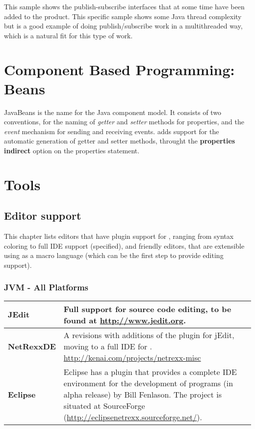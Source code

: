 {
This sample shows the publish-subscribe interfaces that at some time have been
added to the product. This specific sample shows some Java thread
complexity but is a good example of doing publish/subscribe work in a
multithreaded way, which is a natural fit for this type of work.



\chapter{Component Based Programming: Beans}
JavaBeans is the name for the Java component model. It consists of two
conventions, for the naming of \emph{getter} and \emph{setter} methods
for properties, and the \emph{event} mechanism for sending and
receiving events. \nr{} adds support for the automatic generation of
getter and setter methods, throught the \textbf{properties indirect}
option on the properties statement.



\chapter{\nr{} Tools}
\section{Editor support}\label{editors}
This chapter lists editors that have plugin support for \nr{},
ranging from syntax coloring to full IDE support (specified), and
\Rexx{} friendly editors, that are extensible using \Rexx{} as a macro
language (which can be the first step to provide \nr{} editing support).
\subsection{JVM - All Platforms}
\begin{tabularx}{\textwidth}{>{\bfseries}lX}
\toprule
JEdit & Full support for \nr{} source code editing, to be found at
\url{http://www.jedit.org}.
\\\midrule
NetRexxDE & A revisions with additions of the \nr{} plugin for
jEdit, moving to a full IDE for \nr{}. \url{http://kenai.com/projects/netrexx-misc} 
\\\midrule
Eclipse & Eclipse has a \nr{} plugin that provides a complete IDE
environment for the development of \nr{} programs (in alpha release)
by Bill Fenlason. The project is situated at SourceForge
(\url{http://eclipsenetrexx.sourceforge.net/}).
\\\bottomrule
\end{tabularx}
}
